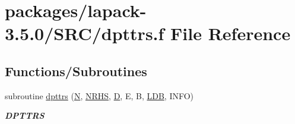 \hypertarget{dpttrs_8f}{}\section{packages/lapack-\/3.5.0/\+S\+R\+C/dpttrs.f File Reference}
\label{dpttrs_8f}
\subsection*{Functions/\+Subroutines}
\begin{DoxyCompactItemize}
\item 
subroutine \hyperlink{group__doublePTcomputational_gaf3cb531de6ceb79732d438ad3b66132a}{dpttrs} (\hyperlink{polmisc_8c_a0240ac851181b84ac374872dc5434ee4}{N}, \hyperlink{example__user_8c_aa0138da002ce2a90360df2f521eb3198}{N\+R\+H\+S}, \hyperlink{odrpack_8h_a7dae6ea403d00f3687f24a874e67d139}{D}, E, B, \hyperlink{example__user_8c_a50e90a7104df172b5a89a06c47fcca04}{L\+D\+B}, I\+N\+F\+O)
\begin{DoxyCompactList}\small\item\em {\bfseries D\+P\+T\+T\+R\+S} \end{DoxyCompactList}\end{DoxyCompactItemize}
